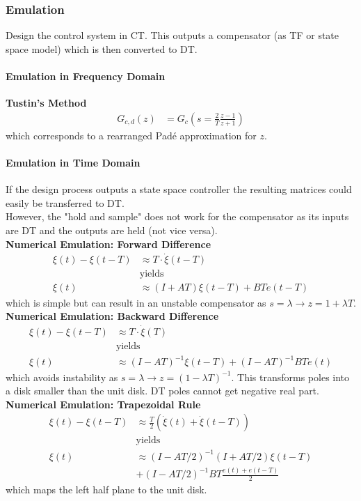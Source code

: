 \subsubsection{Emulation}
Design the control system in CT. This outputs a compensator (as TF or state space model) which is then converted to DT.
\paragraph{Emulation in Frequency Domain}
\textbf{Tustin's Method}\\
\noindent\begin{align*}
    G_{c,d}(z) & =G_{c}\left(s=\frac2T\frac{z-1}{z+1}\right)
\end{align*}
which corresponds to a rearranged Padé approximation for $z$.
\paragraph{Emulation in Time Domain}
If the design process outputs a state space controller the resulting matrices could easily be transferred to DT.\\
However, the "hold and sample" does not work for the compensator as its inputs are DT and the outputs are held (not vice versa).\\
\textbf{Numerical Emulation: Forward Difference}\\
\noindent\begin{align*}
    \xi(t)-\xi(t-T) & \approx T\cdot\dot{\xi}(t-T)   \\
                    & \text{yields}                  \\
    \xi(t)          & \approx(I+AT)\xi(t-T)+BTe(t-T)
\end{align*}
which is simple but can result in an unstable compensator as $s=\lambda \rightarrow z=1+\lambda T$.\\
%
\textbf{Numerical Emulation: Backward Difference}\\
\noindent\begin{align*}
    \xi(t)-\xi(t-T) & \approx T\cdot\dot{\xi}(T)                   \\
                    & \text{yields}                                \\
    \xi(t)          & \approx(I-AT)^{-1}\xi(t-T)+(I-AT)^{-1}BTe(t)
\end{align*}
which avoids instability as $s=\lambda \rightarrow z=(1-\lambda T)^{-1}$. This transforms poles into a disk smaller than the unit disk. DT poles cannot get negative real part.\\
\textbf{Numerical Emulation: Trapezoidal Rule}\\
\noindent\begin{align*}
    \xi(t)-\xi(t-T) & \approx \frac T2\left(\dot{\xi}(t)+\dot{\xi}(t-T)\right) \\
                    & \text{yields}                                            \\
    \xi(t)          & \approx(I-AT/2)^{-1}(I+AT/2)\xi(t-T)                     \\
                    & +(I-AT/2)^{-1}BT\frac{e(t)+e(t-T)}2
\end{align*}
which maps the left half plane to the unit disk.